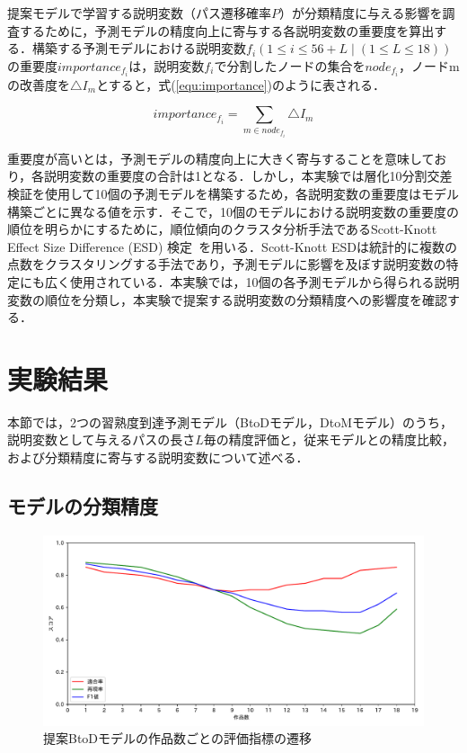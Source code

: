 \documentclass[11pt,dvipdfmx]{jreport}
\begin{document}
提案モデルで学習する説明変数（パス遷移確率$P$）が分類精度に与える影響を調査するために，予測モデルの精度向上に寄与する各説明変数の重要度を算出する．構築する予測モデルにおける説明変数\(f_{i}(1 \leq i \leq 56 + L \mid (1 \leq L \leq 18))\)の重要度\(importance_{f_{i}}\)は，説明変数\(f_{i}\)で分割したノードの集合を\(node_{f_{i}}\)，ノードmの改善度を\(\triangle I_{m}\)とすると，式(\ref{equ:importance})のように表される．


\begin{equation}
	\label{equ:importance}
	importance_{f_{i}}=\sum_{m\in node_{f_{i}}}\triangle{I_{m}}
\end{equation}
\vspace{0.5mm}


\noindent 重要度が高いとは，予測モデルの精度向上に大きく寄与することを意味しており，各説明変数の重要度の合計は1となる．しかし，本実験では層化10分割交差検証を使用して10個の予測モデルを構築するため，各説明変数の重要度はモデル構築ごとに異なる値を示す．そこで，10個のモデルにおける説明変数の重要度の順位を明らかにするために，順位傾向のクラスタ分析手法であるScott-Knott Effect Size Difference (ESD) 検定~\cite{Tantithamthavorn_2019}を用いる．Scott-Knott ESDは統計的に複数の点数をクラスタリングする手法であり，予測モデルに影響を及ぼす説明変数の特定にも広く使用されている．本実験では，10個の各予測モデルから得られる説明変数の順位を分類し，本実験で提案する説明変数の分類精度への影響度を確認する．

\section{実験結果}

本節では，2つの習熟度到達予測モデル（BtoDモデル，DtoMモデル）のうち，説明変数として与えるパスの長さ$L$毎の精度評価と，従来モデルとの精度比較，および分類精度に寄与する説明変数について述べる．

\subsection{モデルの分類精度}\label{subsec:model-result}

\begin{figure}[t]
	\centering
	\includegraphics[width=1.0\linewidth]{Okamoto_fig/btod-lines2.pdf}
	\caption{提案BtoDモデルの作品数ごとの評価指標の遷移}
	\label{fig:btod-lines}
\end{figure}
\end{document}
